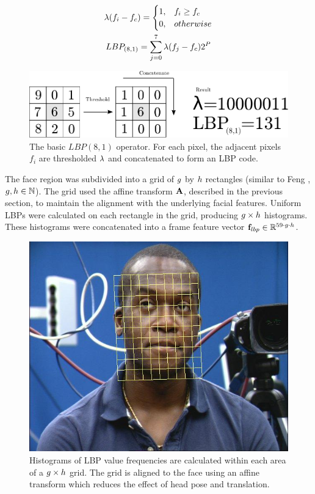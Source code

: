 \begin{gather}
\lambda(f_i-f_c) = \begin{cases} 1, & f_i \ge f_c \\ 0, & otherwise \end{cases}\\
{LBP_{(8,1)} = \displaystyle\sum\limits_{j=0}^7 \lambda(f_j - f_c)2^P}
\end{gather}

\begin{figure}[tb]
\centering
\includegraphics[width = 0.8 \columnwidth]{nvcclass/lbpfigure.pdf}
\caption{The basic $LBP{(8,1)}$ operator. For each pixel, the adjacent pixels $f_i$ are thresholded $\lambda$ and concatenated to form an \ac{LBP} code.}
\label{FigureLbp}
\end{figure}


The face region was subdivided into a grid of $g$ by $h$ rectangles (similar to Feng \etal \cite{Feng2005}, $g, h \in \mathbb{N}$). The grid used the affine transform $\textbf{A}$, described in the previous section, to maintain the alignment with the underlying facial features. Uniform \ac{LBP}s were calculated on each rectangle in the grid, producing $g\times h$ histograms. These histograms were concatenated into a frame feature vector $\textbf{f}_{lbp} \in \mathbb{R} ^ {59\cdot g\cdot h}$.

\begin{figure}[tb]
\centering
\includegraphics[width = 0.8 \columnwidth]{nvcclass/lbp-face-grid-overlay.jpg}
\caption{Histograms of \ac{LBP} value frequencies are calculated within each area of a $g\times h$ grid. The grid is aligned to the face using an affine transform which reduces the effect of head pose and translation.}
\label{FigureLbpGrid}
\end{figure}

